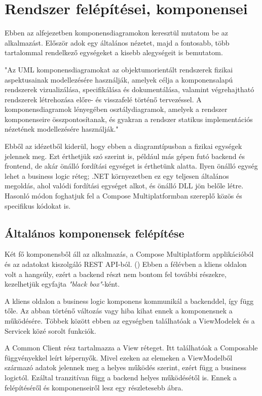 \section{Rendszer felépítései, komponensei}
\label{sec:Components}

Ebben az alfejezetben komponensdiagramokon keresztül mutatom be az alkalmazást.  
Először adok egy általános nézetet, majd a fontosabb, több tartalommal rendelkező egységeket a kisebb alegységeit is bemutatom.  

"Az UML komponensdiagramokat az objektumorientált rendszerek fizikai aspektusainak modellezésére használják, amelyek célja a komponensalapú rendszerek vizualizálása, specifikálása és dokumentálása, valamint végrehajtható rendszerek létrehozása előre- és visszafelé történő tervezéssel. A komponensdiagramok lényegében osztálydiagramok, amelyek a rendszer komponenseire összpontosítanak, és gyakran a rendszer statikus implementációs nézetének modellezésére használják." \cite{ComponentDiagram}  

Ebből az idézetből kiderül, hogy ebben a diagramtípusban a fizikai egységek jelennek meg.  
Ezt érthetjük szó szerint is, például más gépen futó backend és frontend, de akár önálló fordítási egységet is érthetünk alatta.  
Ilyen önálló egység lehet a business logic réteg; .NET környezetben ez egy teljesen általános megoldás, ahol valódi fordítási egységet alkot, és önálló DLL jön belőle létre.  
Hasonló módon foghatjuk fel a Compose Multiplatformban szereplő közös és specifikus kódokat is.  

\subsection{Általános komponensek felépítése}

Két fő komponensből áll az alkalmazás, a Compose Multiplatform applikációból és az adatokat kiszolgáló REST API-ból. ()  
Ebben a félévben a kliens oldalon volt a hangsúly, ezért a backend részt nem bontom fel további részekre, kezelhetjük egyfajta \emph{"black box"}-ként.  

A kliens oldalon a business logic komponens kommunikál a backenddel, így függ tőle. Az abban történő változás vagy hiba kihat ennek a komponensnek a működésére.  
Többek között ebben az egységben találhatóak a ViewModelek és a Servicek közé sorolt funkciók.  

A Common Client rész tartalmazza a View réteget.  
Itt találhatóak a Composable függvényekkel leírt képernyők.  
Mivel ezeken az elemeken a ViewModelből származó adatok jelennek meg a helyes működés szerint, ezért függ a business logictól.  
Ezáltal tranzitívan függ a backend helyes működésétől is.  
Ennek a felépítéséről és komponenseiről lesz egy részletesebb ábra.  

